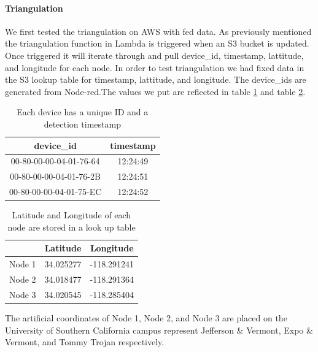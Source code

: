 \documentclass[conference]{IEEEtran}
\begin{document}
\paragraph{Triangulation}
We first tested the triangulation on AWS with fed data. As previously mentioned the triangulation function in Lambda is triggered when an S3 bucket is updated. Once triggered it will iterate through and pull device\_id, timestamp, lattitude, and longitude for each node. In order to test triangulation we had fixed data in the S3 lookup table for timestamp, lattitude, and longitude. The device\_ids are generated from Node-red.The values we put are reflected in table  \ref{tab1} and table  \ref{tab2}.




\begin{table}[htbp]
\caption{Each device has a unique ID and a detection timestamp }
\begin{center}
 \begin{tabular}{||c | c||} 
 \hline
device\_id & timestamp \\ [0.5ex] 
 \hline\hline
 00-80-00-00-04-01-76-64 & 12:24:49 \\ 
 \hline
 00-80-00-00-04-01-76-2B & 12:24:51 \\
 \hline
 00-80-00-00-04-01-75-EC & 12:24:52\\
 \hline
\end{tabular}
\label{tab1}
\end{center}
\end{table}
\begin{table}[htbp]
\caption{Latitude and Longitude of each node are stored in a look up table }
\begin{center}
 \begin{tabular}{||c |c  c||} 
 \hline
&Latitude & Longitude \\ [0.5ex] 
 \hline\hline
Node 1 & 34.025277 & -118.291241 \\ 
 \hline
Node 2 & 34.018477 & -118.291364\\
 \hline
Node 3 & 34.020545 & -118.285404\\
 \hline
\end{tabular}
\label{tab2}
\end{center}
\end{table}

The artificial coordinates of Node 1, Node 2, and Node 3 are placed on the University of Southern California campus represent Jefferson \& Vermont, Expo \& Vermont, and Tommy Trojan respectively.
\end{document}
